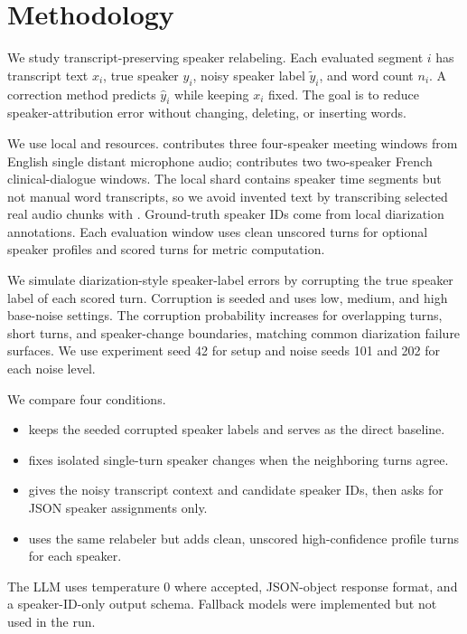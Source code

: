 \section{Methodology}
\label{sec:methodology}

 We study transcript-preserving speaker relabeling. Each evaluated segment $i$ has transcript text $x_i$, true speaker $y_i$, noisy speaker label $\tilde{y}_i$, and word count $n_i$. A correction method predicts $\hat{y}_i$ while keeping $x_i$ fixed. The goal is to reduce speaker-attribution error without changing, deleting, or inserting words.

 We use local \amisdm and \simsamu resources. \amisdm contributes three four-speaker meeting windows from English single distant microphone audio; \simsamu contributes two two-speaker French clinical-dialogue windows. The local \amisdm shard contains speaker time segments but not manual word transcripts, so we avoid invented text by transcribing selected real audio chunks with \asrmodel. Ground-truth speaker IDs come from local diarization annotations. Each evaluation window uses clean unscored turns for optional speaker profiles and scored turns for metric computation.



 We simulate diarization-style speaker-label errors by corrupting the true speaker label of each scored turn. Corruption is seeded and uses low, medium, and high base-noise settings. The corruption probability increases for overlapping turns, short turns, and speaker-change boundaries, matching common diarization failure surfaces. We use experiment seed 42 for setup and noise seeds 101 and 202 for each noise level.

 We compare four conditions.
\begin{itemize}[leftmargin=*,itemsep=0pt,topsep=0pt]
    \item \noisylabels keeps the seeded corrupted speaker labels and serves as the direct baseline.
    \item \smooth fixes isolated single-turn speaker changes when the neighboring turns agree.
    \item \llmnoprofile gives \relabelmodel the noisy transcript context and candidate speaker IDs, then asks for JSON speaker assignments only.
    \item \llmprofile uses the same relabeler but adds clean, unscored high-confidence profile turns for each speaker.
\end{itemize}
The LLM uses temperature 0 where accepted, JSON-object response format, and a speaker-ID-only output schema. Fallback models were implemented but not used in the run.

